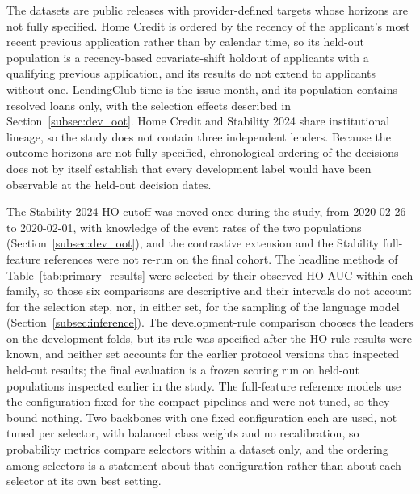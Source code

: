 \documentclass[final,5p,twocolumn]{elsarticle}
\begin{document}
The datasets are public releases with provider-defined targets whose horizons are not fully specified. Home Credit is ordered by the recency of the applicant's most recent previous application rather than by calendar time, so its held-out population is a recency-based covariate-shift holdout of applicants with a qualifying previous application, and its results do not extend to applicants without one. LendingClub time is the issue month, and its population contains resolved loans only, with the selection effects described in Section~\ref{subsec:dev_oot}. Home Credit and Stability 2024 share institutional lineage, so the study does not contain three independent lenders. Because the outcome horizons are not fully specified, chronological ordering of the decisions does not by itself establish that every development label would have been observable at the held-out decision dates.

The Stability 2024 HO cutoff was moved once during the study, from 2020-02-26 to 2020-02-01, with knowledge of the event rates of the two populations (Section~\ref{subsec:dev_oot}), and the contrastive extension and the Stability full-feature references were not re-run on the final cohort. The headline methods of Table~\ref{tab:primary_results} were selected by their observed HO AUC within each family, so those six comparisons are descriptive and their intervals do not account for the selection step, nor, in either set, for the sampling of the language model (Section~\ref{subsec:inference}). The development-rule comparison chooses the leaders on the development folds, but its rule was specified after the HO-rule results were known, and neither set accounts for the earlier protocol versions that inspected held-out results; the final evaluation is a frozen scoring run on held-out populations inspected earlier in the study. The full-feature reference models use the configuration fixed for the compact pipelines and were not tuned, so they bound nothing. Two backbones with one fixed configuration each are used, not tuned per selector, with balanced class weights and no recalibration, so probability metrics compare selectors within a dataset only, and the ordering among selectors is a statement about that configuration rather than about each selector at its own best setting.
\end{document}
